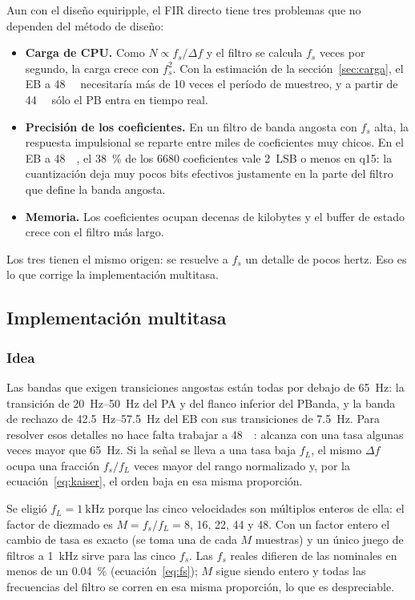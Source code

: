 \documentclass[11pt,a4paper]{article}
\begin{document}
Aun con el diseño equiripple, el FIR directo tiene tres problemas que no dependen
del método de diseño:
\begin{itemize}
  \item \textbf{Carga de CPU.} Como $N \propto f_s/\Delta f$ y el filtro se
        calcula $f_s$ veces por segundo, la carga crece con $f_s^2$. Con la
        estimación de la sección~\ref{sec:carga}, el EB a
        \qty{48}{\kilo\sps} necesitaría más de 10 veces el período de
        muestreo, y a partir de \qty{44}{\kilo\sps} sólo el PB entra en
        tiempo real.
  \item \textbf{Precisión de los coeficientes.} En un filtro de banda
        angosta con $f_s$ alta, la respuesta impulsional se reparte entre
        miles de coeficientes muy chicos. En el EB a \qty{48}{\kilo\sps}, el
        \qty{38}{\percent} de los \num{6680} coeficientes vale 2~LSB o menos
        en q15: la cuantización deja muy pocos bits efectivos justamente en
        la parte del filtro que define la banda angosta.
  \item \textbf{Memoria.} Los coeficientes ocupan decenas de kilobytes y el
        buffer de estado crece con el filtro más largo.
\end{itemize}
Los tres tienen el mismo origen: se resuelve a $f_s$ un detalle de pocos
hertz. Eso es lo que corrige la implementación multitasa.

\subsection{Implementación multitasa}\label{sec:multitasa}

\subsubsection{Idea}

Las bandas que exigen transiciones angostas están todas por debajo de
\qty{65}{\hertz}: la transición de \qtyrange{20}{50}{\hertz} del PA y del
flanco inferior del PBanda, y la banda de rechazo de
\qtyrange{42.5}{57.5}{\hertz} del EB con sus transiciones de
\qty{7.5}{\hertz}. Para resolver esos detalles no hace falta trabajar a
\qty{48}{\kilo\sps}: alcanza con una tasa algunas veces mayor que
\qty{65}{\hertz}. Si la señal se lleva a una tasa baja $f_L$, el mismo
$\Delta f$ ocupa una fracción $f_s/f_L$ veces mayor del rango normalizado y,
por la ecuación~\eqref{eq:kaiser}, el orden baja en esa misma proporción.

Se eligió $f_L = \qty{1}{\kilo\hertz}$ porque las cinco velocidades son
múltiplos enteros de ella: el factor de diezmado es $M = f_s/f_L = 8$, 16,
22, 44 y 48. Con un factor entero el cambio de tasa es exacto (se toma una
de cada $M$ muestras) y un único juego de filtros a \qty{1}{\kilo\hertz}
sirve para las cinco $f_s$. Las $f_s$ reales difieren de las nominales en
menos de un \qty{0.04}{\percent} (ecuación~\eqref{eq:fs}); $M$ sigue siendo
entero y todas las frecuencias del filtro se corren en esa misma proporción,
lo que es despreciable.
\end{document}
